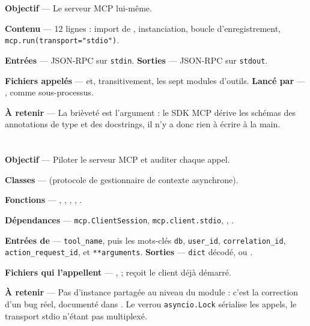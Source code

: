 \textbf{Objectif} --- Le serveur MCP lui-même.

\textbf{Contenu} --- 12 lignes : import de , instanciation,
boucle d'enregistrement, \texttt{mcp.run(transport="stdio")}.

\textbf{Entrées} --- JSON-RPC sur \texttt{stdin}.
\textbf{Sorties} --- JSON-RPC sur \texttt{stdout}.

\textbf{Fichiers appelés} ---  et, transitivement, les sept
modules d'outils. \textbf{Lancé par} --- , comme sous-processus.

\textbf{À retenir} --- La brièveté est l'argument : le SDK MCP dérive les
schémas des annotations de type et des docstrings, il n'y a donc rien à écrire
à la main.

\section{}

\textbf{Objectif} --- Piloter le serveur MCP et auditer chaque appel.

\textbf{Classes} ---  (protocole de gestionnaire de
contexte asynchrone).

\textbf{Fonctions} --- , , ,
, .

\textbf{Dépendances} --- \texttt{mcp.ClientSession},
\texttt{mcp.client.stdio}, ,
.

\textbf{Entrées de } --- \texttt{tool\_name}, puis les mots-clés
\texttt{db}, \texttt{user\_id}, \texttt{correlation\_id},
\texttt{action\_request\_id}, et \texttt{**arguments}.
\textbf{Sorties} --- \texttt{dict} décodé, ou .

\textbf{Fichiers qui l'appellent} --- ,  ;
 reçoit le client déjà démarré.

\textbf{À retenir} --- Pas d'instance partagée au niveau du module : c'est la
correction d'un bug réel, documenté dans . Le verrou
\texttt{asyncio.Lock} sérialise les appels, le transport stdio n'étant pas
multiplexé.

\section{}

